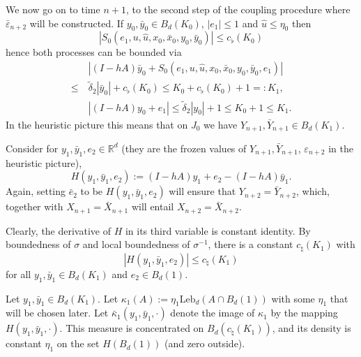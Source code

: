 \documentclass{article}
\begin{document}
We now go on to time $n+1$, to the second step of the coupling procedure where $\bar{\varepsilon}_{n+2}$ will be
constructed. If $y_{0},\bar{y}_{0}\in B_{d}(K_{0})$, $|e_{1}|\leq 1$ and $\hat{u}\leq \eta_{0}$
then $$
|S_0(e_{1},u,\hat{u},x_0,\bar{x}_0,y_0,\bar{y}_0)|\leq c_{\flat}(K_{0})
$$
hence both processes can be bounded via
\begin{align*}
  &|(I-hA)\bar{y}_{0}+S_{0}(e_{1},u,\hat{u},x_0,\bar{x}_0,y_0,\bar{y}_0,e_1)|\\
  \leq~&\tilde{\delta}_{2}|\bar{y}_{0}| + c_{\flat}(K_{0}) \leq K_{0}+c_{\flat}(K_{0})+1=:K_{1},\\
&|(I-hA){y}_{0}+e_{1}|\leq \tilde{\delta}_{2}|{y}_{0}|+1\leq K_{0}
         +1\leq K_{1}.
\end{align*}
In the heuristic picture this means that on $J_{0}$ we have $Y_{n+1},\bar{Y}_{n+1}\in B_{d}(K_{1})$.

Consider for $y_1,\bar{y}_1,e_2\in\mathbb{R}^d$ (they are the frozen values of $Y_{n+1},\bar{Y}_{n+1}$, $\varepsilon_{n+2}$
in the heuristic picture),
$$
H(y_{1},\bar{y}_{1},e_2):=(I-hA)y_1+e_2-(I-hA)\bar{y}_{1}.
$$
Again, setting $\bar{e}_2$ to be $H(y_{1},\bar{y}_{1},e_2)$ will ensure that $Y_{n+2}=\bar{Y}_{n+2}$,
which, together with $X_{n+1}=\bar{X}_{n+1}$ will entail $X_{n+2}=\bar{X}_{n+2}$.

Clearly, the derivative of $H$ in its third variable is constant identity.
By boundedness of $\sigma$ and local boundedness of $\sigma^{-1}$, there is a constant $c_\natural(K_1)$ with
\begin{equation}\label{dorh}
|H(y_{1},\bar{y}_{1},e_2)|\leq c_\natural(K_1)
\end{equation}
for all $y_{1},\bar{y}_{1}\in B_d(K_{1})$ and $e_2\in B_d(1)$.

Let $y_{1},\bar{y}_{1}\in B_d(K_{1})$.
Let $\kappa_1(A):=\eta_1 \mathrm{Leb}_{d}(A\cap B_d(1))$ with some $\eta_1$ that will be chosen later.
Let $\bar{\kappa}_1(y_{1},\bar{y}_{1},\cdot)$ denote the image of $\kappa_1$ by the mapping $H(y_{1},\bar{y}_{1},\cdot)$.
This measure is concentrated on
$B_{d}(c_\natural(K_{1}))$, and its density is constant $\eta_{1}$ on the set $H(B_{d}(1))$ (and zero outside).
\end{document}
